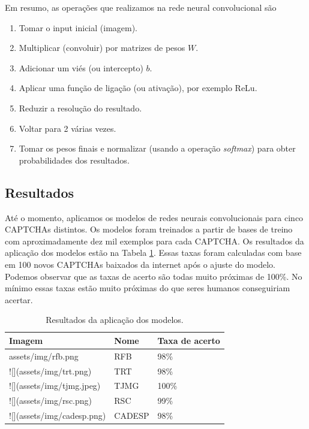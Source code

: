 \documentclass[12pt,]{report}
\providecommand{\tightlist}{%
  \setlength{\itemsep}{0pt}\setlength{\parskip}{0pt}}
\begin{document}
Em resumo, as operações que realizamos na rede neural convolucional são

\begin{enumerate}
\def\labelenumi{\arabic{enumi}.}
\tightlist
\item
  Tomar o input inicial (imagem).
\item
  Multiplicar (convoluir) por matrizes de pesos \(W\).
\item
  Adicionar um viés (ou intercepto) \(b\).
\item
  Aplicar uma função de ligação (ou ativação), por exemplo ReLu.
\item
  Reduzir a resolução do resultado.
\item
  Voltar para 2 várias vezes.
\item
  Tomar os pesos finais e normalizar (usando a operação \emph{softmax}) para obter probabilidades dos resultados.
\end{enumerate}

\hypertarget{resultados}{%
\subsection{Resultados}\label{resultados}}

Até o momento, aplicamos os modelos de redes neurais convolucionais para cinco CAPTCHAs distintos. Os modelos foram treinados a partir de bases de treino com aproximadamente dez mil exemplos para cada CAPTCHA. Os resultados da aplicação dos modelos estão na Tabela \ref{tab:resultados}. Essas taxas foram calculadas com base em 100 novos CAPTCHAs baixados da internet após o ajuste do modelo. Podemos observar que as taxas de acerto são todas muito próximas de 100\%. No mínimo essas taxas estão muito próximas do que seres humanos conseguiriam acertar.

\begin{table}

\caption{\label{tab:resultados}Resultados da aplicação dos modelos.}
\centering
\begin{tabular}[t]{l|l|l}
\hline
Imagem & Nome & Taxa de acerto\\
\hline
assets/img/rfb.png & RFB & 98\%\\
\hline
![](assets/img/trt.png) & TRT & 98\%\\
\hline
![](assets/img/tjmg.jpeg) & TJMG & 100\%\\
\hline
![](assets/img/rsc.png) & RSC & 99\%\\
\hline
![](assets/img/cadesp.png) & CADESP & 98\%\\
\hline
\end{tabular}
\end{table}
\end{document}
